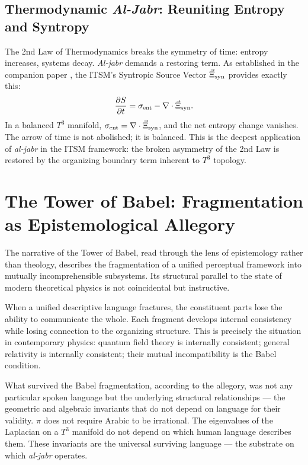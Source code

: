 \documentclass[aps,prd,11pt,onecolumn,superscriptaddress,nofootinbib,floatfix]{revtex4-2}
\begin{document}
\subsection{Thermodynamic \textit{Al-Jabr}: Reuniting Entropy and Syntropy}

The 2nd Law of Thermodynamics breaks the symmetry of time: entropy increases, systems decay. \textit{Al-jabr} demands a restoring term. As established in the companion paper \cite{itsm_thermo}, the ITSM's Syntropic Source Vector $\vec{\Xi}_{\rm syn}$ provides exactly this:
\begin{equation}
    \frac{\partial S}{\partial t} = \sigma_{\rm ent} - \nabla \cdot \vec{\Xi}_{\rm syn}.
\end{equation}
In a balanced $T^3$ manifold, $\sigma_{\rm ent} = \nabla \cdot \vec{\Xi}_{\rm syn}$, and the net entropy change vanishes. The arrow of time is not abolished; it is balanced. This is the deepest application of \textit{al-jabr} in the ITSM framework: the broken asymmetry of the 2nd Law is restored by the organizing boundary term inherent to $T^3$ topology.

\section{The Tower of Babel: Fragmentation as Epistemological Allegory}
\label{sec:babel}

The narrative of the Tower of Babel, read through the lens of epistemology rather than theology, describes the fragmentation of a unified perceptual framework into mutually incomprehensible subsystems. Its structural parallel to the state of modern theoretical physics is not coincidental but instructive.

When a unified descriptive language fractures, the constituent parts lose the ability to communicate the whole. Each fragment develops internal consistency while losing connection to the organizing structure. This is precisely the situation in contemporary physics: quantum field theory is internally consistent; general relativity is internally consistent; their mutual incompatibility is the Babel condition.

What survived the Babel fragmentation, according to the allegory, was not any particular spoken language but the underlying structural relationships --- the geometric and algebraic invariants that do not depend on language for their validity. $\pi$ does not require Arabic to be irrational. The eigenvalues of the Laplacian on a $T^3$ manifold do not depend on which human language describes them. These invariants are the universal surviving language --- the substrate on which \textit{al-jabr} operates.
\end{document}
